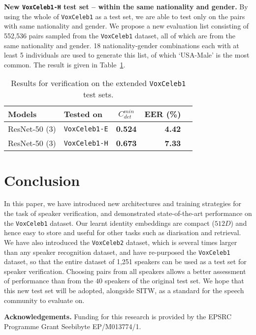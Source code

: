 \documentclass[a4paper]{article}
\def\newpara{\vspace{2pt}}
\def\aftertab{\vspace{-22pt}}
\begin{document}
\newpara\noindent\textbf{New \texttt{VoxCeleb1-H} test set --  within the same nationality and gender.}
By using the whole of \texttt{VoxCeleb1} as a test set,  we are able to test only on the pairs with same nationality and gender. 
We propose a new evaluation list consisting of 552,536 pairs sampled from the 
\texttt{VoxCeleb1} dataset, all of which are from the same nationality
and gender. 18 nationality-gender combinations each with at least 5 individuals are used
to generate this list, of which `USA-Male' is the most common.
The result is given in Table~\ref{table:results_vox1e}.

\begin{table}[h!]
\centering
\footnotesize
\begin{tabular}{ l l c r  r  }

\textbf{Models} & \textbf{Tested on} & $C^{min}_{det}$ & EER (\%) \\ \hline  
 ResNet-50 (3) 			& \texttt{VoxCeleb1-E} & {\bf 0.524} & {\bf 4.42} \\ 
 ResNet-50 (3) 			& \texttt{VoxCeleb1-H} & {\bf 0.673} & {\bf 7.33} \\ 
\end{tabular} 
\vspace{3pt}

\caption{Results for verification on the extended {\tt VoxCeleb1} test sets.}
\label{table:results_vox1e}
\normalsize
\aftertab
\vspace{-10pt}
\end{table}

\section{Conclusion}


In this paper, we have introduced new architectures and training strategies for the task of speaker verification, and demonstrated state-of-the-art performance on the \texttt{VoxCeleb1} dataset. 
Our learnt identity embeddings are compact ($512D$) and hence easy to store and useful for other tasks such as diarisation and retrieval.
We have also introduced the \texttt{VoxCeleb2} dataset, which is several times larger than any speaker recognition dataset, and
have re-purposed the \texttt{VoxCeleb1}  dataset, so that the entire dataset 
of 1,251 speakers can be used as
a test set for speaker verification. Choosing pairs from all speakers allows a 
better assessment of performance than from the $40$ speakers of the original test set. We hope that this
new test set will be adopted, alongside SITW, as a standard for the speech community to
evaluate on.


 \newpara\noindent\textbf{Acknowledgements.}
 Funding for this research is provided by the EPSRC 
 Programme Grant Seebibyte EP/M013774/1. 




\end{document}
